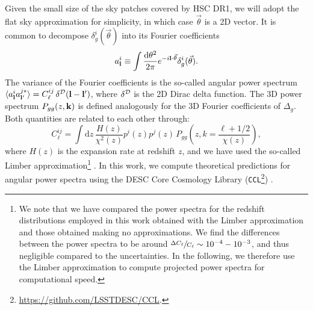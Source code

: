 \documentclass[a4paper,11pt]{article}
\newcommand{\nv}{\vec{\theta}}
\begin{document}
    Given the small size of the sky patches covered by HSC DR1, we will adopt the flat sky approximation for simplicity, in which case $\nv$ is a 2D vector. It is common to decompose $\delta^i_g(\nv)$ into its Fourier coefficients
    \begin{equation}
      a^i_{\bf l}\equiv \int\frac{\mathrm{d}\theta^2}{2\pi}e^{-i{\bf l}\cdot\nv}\delta^i_g(\nv).
    \end{equation}
    The variance of the Fourier coefficients is the so-called angular power spectrum $\langle a^i_{\bf l}a^{j*}_{{\bf l}'}\rangle = C^{ij}_\ell\,\delta^{\cal D}({\bf l}-{\bf l}')$, where $\delta^{\cal D}$ is the 2D Dirac delta function. The 3D power spectrum $P_{gg}(z,{\bf k})$ is defined analogously for the 3D Fourier coefficients of $\Delta_g$. Both quantities are related to each other through:
    \begin{equation}\label{eq:cell_gg_limber}
      C^{ij}_\ell = \int \mathrm{d}z\,\frac{H(z)}{\chi^2(z)} p^i(z)p^j(z)\,P_{gg}\left(z,k=\frac{\ell+1/2}{\chi(z)}\right),
    \end{equation}
    where $H(z)$ is the expansion rate at redshift $z$, and we have used the so-called Limber approximation\footnote{We note that we have compared the power spectra for the redshift distributions employed in this work obtained with the Limber approximation and those obtained making no approximations. We find the differences between the power spectra to be around $\sfrac{\Delta C_{\ell}}{C_{\ell}} \sim 10^{-4}-10^{-3}$, and thus negligible compared to the uncertainties. In the following, we therefore use the Limber approximation to compute projected power spectra for computational speed.} \citep{Limber:1953, Kaiser:1992, Kaiser:1998}. In this work, we compute theoretical predictions for angular power spectra using the DESC Core Cosmology Library (\texttt{CCL}\footnote{\url{https://github.com/LSSTDESC/CCL}.}) \cite{Chisari:2019}.
\end{document}
